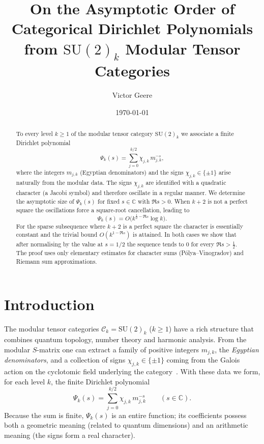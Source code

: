 \documentclass[11pt,a4paper]{article}
\title{\bfseries On the Asymptotic Order of Categorical Dirichlet Polynomials\\[4pt]
\large from $\mathrm{SU}(2)_k$ Modular Tensor Categories}
\author{Victor Geere}
\date{\today}
\theoremstyle{definition}
\theoremstyle{remark}
\begin{document}
\maketitle

\begin{abstract}
To every level $k\ge1$ of the modular tensor category $\mathrm{SU}(2)_k$ we associate a finite
Dirichlet polynomial
\[
\Psi_k(s)=\sum_{j=0}^{k/2}\chi_{j,k}\,m_{j,k}^{-s},
\]
where the integers $m_{j,k}$ (Egyptian denominators) and the signs $\chi_{j,k}\in\{\pm1\}$
arise naturally from the modular data.  The signs $\chi_{j,k}$ are identified with a quadratic
character (a Jacobi symbol) and therefore oscillate in a regular manner.
We determine the asymptotic size of $\Psi_k(s)$ for fixed $s\in\mathbb C$ with $\Re s>0$.
When $k+2$ is not a perfect square the oscillations force a square‑root cancellation,
leading to
\[
\Psi_k(s)=O\bigl(k^{\frac12-\Re s}\log k\bigr).
\]
For the sparse subsequence where $k+2$ is a perfect square the character is essentially constant
and the trivial bound $O(k^{1-\Re s})$ is attained.
In both cases we show that after normalising by the value at $s=1/2$ the sequence tends to $0$
for every $\Re s>\frac12$.  The proof uses only elementary estimates for character sums
(P\'olya--Vinogradov) and Riemann sum approximations.
\end{abstract}

\section{Introduction}

The modular tensor categories $\mathcal{C}_k=\mathrm{SU}(2)_k$ ($k\ge1$) have a rich structure
that combines quantum topology, number theory and harmonic analysis.
From the modular $S$-matrix one can extract a family of positive integers
$m_{j,k}$, the \emph{Egyptian denominators}, and a collection of signs
$\chi_{j,k}\in\{\pm1\}$ coming from the Galois action on the cyclotomic field
underlying the category~\cite{huang}.
With these data we form, for each level $k$, the finite Dirichlet polynomial
\begin{equation}\label{def:Psi}
\Psi_k(s)=\sum_{j=0}^{k/2}\chi_{j,k}\,m_{j,k}^{-s}\qquad(s\in\mathbb C).
\end{equation}
Because the sum is finite, $\Psi_k(s)$ is an entire function; its coefficients
possess both a geometric meaning (related to quantum dimensions) and an arithmetic
meaning (the signs form a real character).
\end{document}
